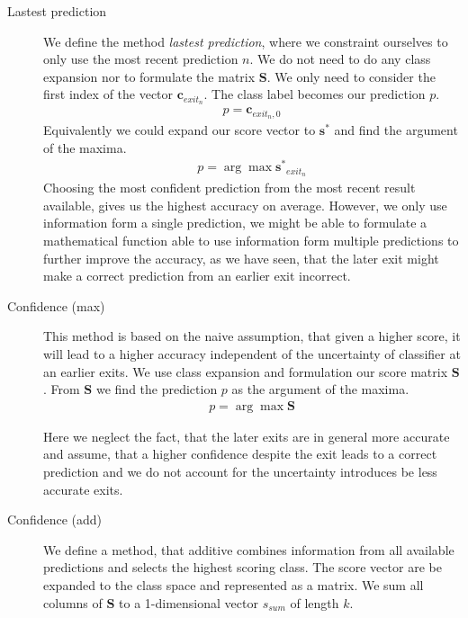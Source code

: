 \begin{description}
	
	\item[Lastest prediction] We define the method \emph{lastest prediction}, where we constraint ourselves to only use the most recent prediction $n$. We do not need to do any class expansion nor to formulate the matrix $\mathbf{S}$. We only need to consider the first index of the vector $\mathbf{c}_{exit_n}$. The class label becomes our prediction $p$.
	\begin{align*}
	p = \mathbf{c}_{exit_n,0}
	\end{align*}
	Equivalently we could expand our score vector to $\mathbf{s^*}$ and find the argument of the maxima.
	\begin{align*}
	p = \arg \max \mathbf{s^*}_{exit_n}	
	\end{align*}
	Choosing the most confident prediction from the most recent result available, gives us the highest accuracy on average. However, we only use information form a single prediction, we might be able to formulate a mathematical function able to use information form multiple predictions to further improve the accuracy, as we have seen, that the later exit might make a correct prediction from an earlier exit incorrect. 
	
	\item[Confidence (max)] This method is based on the naive assumption, that given a higher score, it will lead to a higher accuracy independent of the uncertainty of classifier at an earlier exits. We use class expansion and  formulation our score matrix $\mathbf{S}$. From $\mathbf{S}$ we find the prediction $p$ as the argument of the maxima.
	\begin{align*}
	p = \arg \max  \mathbf{S}
	\end{align*}
	
	Here we neglect the fact, that the later exits are in general more accurate and assume, that a higher confidence despite the exit leads to a correct prediction and we do not account for the uncertainty introduces be less accurate exits.
	
	\item[Confidence (add)] We define a method, that additive combines information from all available predictions and selects the highest scoring class. The score vector are be expanded to the class space and represented as a matrix. We sum all columns of $\mathbf{S}$ to a 1-dimensional vector $s_{sum}$ of length $k$. 
	

\end{description}
